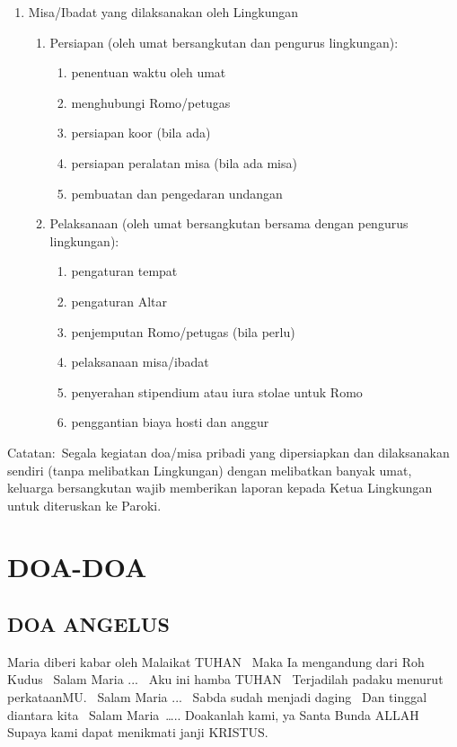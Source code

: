 \documentclass{article}
\begin{document}
\begin{enumerate}
\item Misa/Ibadat yang dilaksanakan oleh Lingkungan

\begin{enumerate}
\item Persiapan (oleh umat bersangkutan dan pengurus lingkungan):

\begin{enumerate}
\item penentuan waktu oleh umat
\item menghubungi Romo/petugas
\item persiapan koor (bila ada)
\item persiapan peralatan misa (bila ada misa)
\item pembuatan dan pengedaran undangan
\end{enumerate}
\item Pelaksanaan (oleh umat bersangkutan bersama dengan pengurus
lingkungan):

\begin{enumerate}
\item pengaturan tempat
\item pengaturan Altar
\item penjemputan Romo/petugas (bila perlu)
\item pelaksanaan misa/ibadat
\item penyerahan stipendium atau iura stolae untuk Romo
\item penggantian biaya hosti dan anggur
\end{enumerate}
\end{enumerate}
\end{enumerate}
Catatan:~Segala kegiatan doa/misa pribadi yang dipersiapkan dan
dilaksanakan sendiri (tanpa melibatkan Lingkungan) dengan melibatkan
banyak umat, keluarga bersangkutan wajib memberikan laporan kepada
Ketua Lingkungan untuk diteruskan ke Paroki.

\section[DOA{}-DOA]{DOA-DOA}
\subsection[DOA \ ANGELUS]{DOA  ANGELUS}
Maria diberi kabar oleh Malaikat TUHAN~ Maka Ia mengandung dari Roh
Kudus~ Salam Maria ...~  Aku ini hamba TUHAN~ Terjadilah padaku menurut
perkataanMU.~ Salam Maria ...~  Sabda sudah menjadi daging~ Dan tinggal
diantara kita~ Salam Maria~{\dots}..  Doakanlah kami, ya Santa Bunda
ALLAH~ Supaya kami dapat menikmati janji KRISTUS.~
\end{document}
